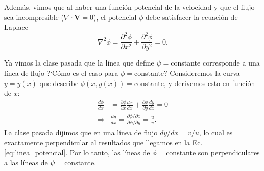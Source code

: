 Además, vimos que al haber una función potencial de la velocidad y que el flujo sea incompresible ($\nabla\cdot\mathbf{V}=0$), el potencial $\phi$ debe satisfacer la ecuación de Laplace
%
\begin{equation}\label{eq:pot_laplace}
\nabla^2\phi = \frac{\partial^2 \phi}{\partial x^2} + \frac{\partial^2 \phi}{\partial y^2} = 0.
\end{equation}

Ya vimos la clase pasada que la línea que define $\psi=$constante corresponde a una línea de flujo \mbox{?`}Cómo es el caso para $\phi=$constante?
Consideremos la curva $y=y(x)$ que describe $\phi(x,y(x))=$constante, y derivemos esto en función de $x$:
%
\begin{align}\label{eq:linea_potencial}
\frac{d\phi}{dx} &= \frac{\partial\phi}{\partial x}\frac{dx}{dx} + \frac{\partial\phi}{\partial y} \frac{dy}{dx} = 0\nonumber\\
\Rightarrow &\frac{dy}{dx} = \frac{\partial\phi/\partial x}{\partial\phi/\partial y} = \frac{u}{v}.
\end{align}
%
La clase pasada dijimos que en una línea de flujo $dy/dx=v/u$, lo cual es exactamente perpendicular al resultados que llegamos en la Ec. \eqref{eq:linea_potencial}.
Por lo tanto, las líneas de $\phi=$constante son perpendiculares a las líneas de $\psi=$constante.

